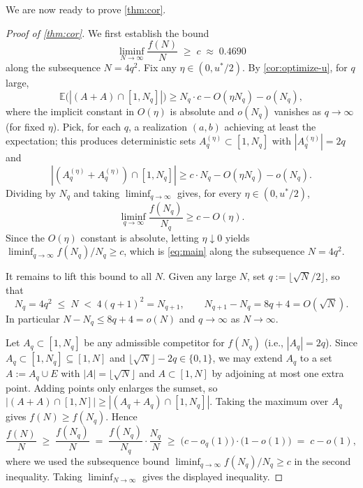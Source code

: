 \documentclass[11pt]{amsart}
\begin{document}
We are now ready to prove \cref{thm:cor}.
\begin{proof}[Proof of \cref{thm:cor}]
We first establish the bound
\begin{equation}\label{eq:main}
\liminf_{N\to\infty}\frac{f(N)}{N} \;\geq\; c \;\approx\; 0.4690
\end{equation}
along the subsequence $N = 4q^2$. Fix any $\eta \in (0, u^*/2)$. By \cref{cor:optimize-u}, for $q$ large,
\[
 \mathbb{E}\bigl(|(A + A) \cap [1, N_q]|\bigr) \geq N_q\cdot c - O(\eta N_q) - o(N_q),
\]
where the implicit constant in $O(\eta)$ is absolute and $o(N_q)$ vanishes as $q\to\infty$ (for fixed $\eta$). Pick, for each $q$, a realization $(a,b)$ achieving at least the expectation; this produces deterministic sets $A_q^{(\eta)} \subset [1, N_q]$ with $|A_q^{(\eta)}| = 2q$ and
\[
 |(A_q^{(\eta)} + A_q^{(\eta)}) \cap [1,N_q]| \geq c \cdot N_q - O(\eta N_q) - o(N_q).
\]
Dividing by $N_q$ and taking $\liminf_{q\to\infty}$ gives, for every $\eta \in (0, u^*/2)$,
\[
\liminf_{q\to\infty} \frac{f(N_q)}{N_q} \geq c - O(\eta).
\]
Since the $O(\eta)$ constant is absolute, letting $\eta \downarrow 0$ yields $\liminf_{q\to\infty} f(N_q)/N_q \geq c$, which is \eqref{eq:main} along the subsequence $N = 4q^2$.

It remains to lift this bound to all $N$.
Given any large $N$, set $q:=\lfloor\sqrt N/2\rfloor$, so that
\begin{equation}\label{eq:subseq-bound}
N_q=4q^2\;\leq\;N\;<\;4(q+1)^2=N_{q+1},\qquad N_{q+1}-N_q=8q+4=O(\sqrt N).
\end{equation}
In particular $N-N_q\leq 8q+4=o(N)$ and $q\to\infty$ as $N\to\infty$.

Let $A_q \subset [1, N_q]$ be any admissible competitor for $f(N_q)$ (i.e., $|A_q| = 2q$). Since $A_q \subset [1, N_q] \subseteq [1, N]$ and $\lfloor\sqrt N\rfloor - 2q \in \{0, 1\}$, we may extend $A_q$ to a set $A := A_q \cup E$ with $|A| = \lfloor\sqrt N\rfloor$ and $A \subset [1, N]$ by adjoining at most one extra point. Adding points only enlarges the sumset, so $|(A+A)\cap[1,N]| \ge |(A_q+A_q)\cap[1,N_q]|$. Taking the maximum over $A_q$ gives $f(N) \ge f(N_q)$. Hence
\[
\frac{f(N)}{N}\;\geq\;\frac{f(N_q)}{N}
\;=\;\frac{f(N_q)}{N_q}\cdot\frac{N_q}{N}
\;\geq\;\bigl(c-o_q(1)\bigr)\cdot\bigl(1-o(1)\bigr)
\;=\;c-o(1),
\]
where we used the subsequence bound $\liminf_{q\to\infty} f(N_q)/N_q \geq c$ in the second inequality. Taking $\liminf_{N\to\infty}$ gives the displayed inequality.
\end{proof}
\end{document}
